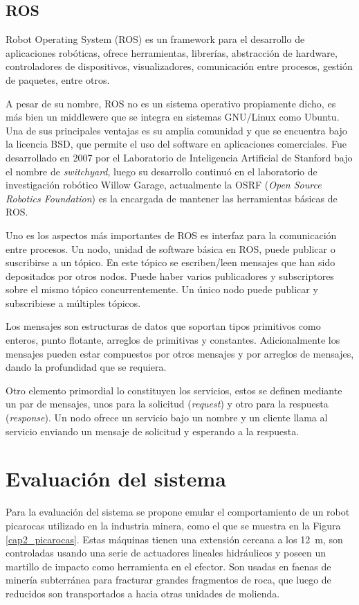 \subsection{ROS}

Robot Operating System (ROS) \cite{quigley2009} es un  framework para el desarrollo de aplicaciones robóticas, ofrece herramientas, librerías, abstracción de hardware, controladores de dispositivos, visualizadores, comunicación entre procesos, gestión de paquetes, entre otros.

A pesar de su nombre, ROS no es un sistema operativo propiamente dicho, es más bien un middlewere que se integra en sistemas GNU/Linux como Ubuntu. Una de sus principales ventajas es su amplia comunidad y que se encuentra bajo la licencia BSD, que permite el uso del software en aplicaciones comerciales. Fue desarrollado en 2007 por el Laboratorio de Inteligencia Artificial de Stanford bajo el nombre de \textit{switchyard}, luego su desarrollo continuó en el laboratorio de investigación robótico Willow Garage, actualmente la OSRF (\textit{Open Source Robotics Foundation}) es la encargada de mantener las herramientas básicas de ROS.

Uno es los aspectos más importantes de ROS es interfaz para la comunicación entre procesos. Un nodo, unidad de software básica en ROS, puede publicar o suscribirse a un tópico. En este tópico se escriben/leen mensajes que han sido depositados por otros nodos. Puede haber varios publicadores y subscriptores sobre el mismo tópico concurrentemente. Un único nodo puede publicar y subscribiese a múltiples tópicos.

Los mensajes son estructuras de datos que soportan tipos primitivos como
enteros, punto flotante, arreglos de primitivas y constantes. Adicionalmente los mensajes pueden estar compuestos por otros mensajes y por arreglos de mensajes, dando la profundidad que se requiera.

Otro elemento primordial lo constituyen los servicios, estos se definen mediante un par de mensajes, unos para la solicitud (\textit{request}) y otro para la respuesta (\textit{response}). Un nodo ofrece un servicio bajo un nombre y un cliente llama al servicio enviando un mensaje de solicitud y esperando a la respuesta.

\section{Evaluación del sistema}

Para la evaluación del sistema se propone emular el comportamiento de un robot picarocas utilizado en la industria minera, como el que se muestra en la Figura \ref{cap2_picarocas}. Estas máquinas tienen una extensión cercana a los \SI{12}{\meter}, son controladas usando una serie de actuadores lineales hidráulicos y poseen un martillo de impacto como herramienta  en el efector. Son usadas en faenas de minería subterránea para fracturar grandes fragmentos de roca, que luego de reducidos son transportados a hacia otras unidades de molienda.

